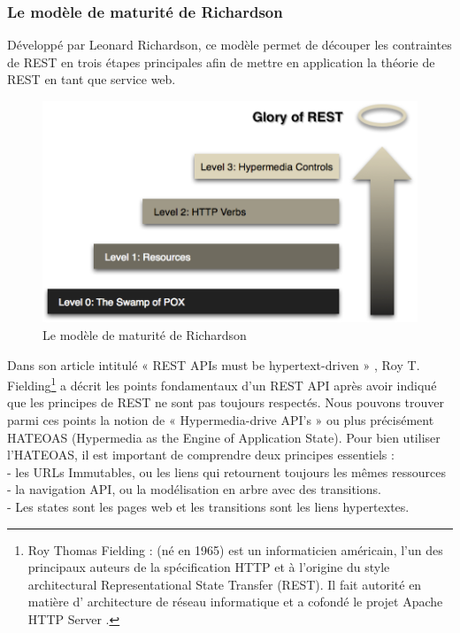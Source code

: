 \subsubsection{Le modèle de maturité de Richardson}
Développé par Leonard Richardson, ce modèle permet de découper les contraintes de REST en trois étapes 
principales afin de mettre en application la théorie de REST en tant que service web.
\begin{figure}[hp]
    \centering
    \includegraphics{images/richardson.png}
    \caption{Le modèle de maturité de Richardson}
\end{figure}

Dans son article intitulé « REST APIs must be hypertext-driven » \cite{rest_hyper}, 
Roy T. Fielding\footnote[11]{Roy Thomas Fielding : (né en 1965) est un informaticien américain, 
l'un des principaux auteurs de la spécification HTTP et à l'origine du style architectural 
Representational State Transfer (REST). Il fait autorité en matière d' architecture de réseau 
informatique et a cofondé le projet Apache HTTP Server .} a décrit les points fondamentaux 
d’un REST API après avoir 
indiqué que les principes de REST ne sont pas toujours respectés. 
Nous pouvons trouver parmi ces points la notion de « Hypermedia-drive API’s » 
ou plus précisément HATEOAS (Hypermedia as the Engine of Application State).
Pour bien utiliser l’HATEOAS, il est important de comprendre deux principes essentiels :\\
-	les URLs Immutables, ou les liens qui retournent toujours les mêmes ressources\\
-	la navigation API, ou la modélisation en arbre avec des transitions.\\
-	Les  states  sont les pages web et les transitions sont les liens hypertextes.\\ 

